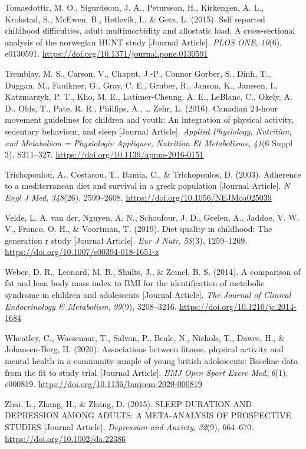 \documentclass[
  letterpaper,
  DIV=11,
  numbers=noendperiod]{scrreport}
\newlength{\cslhangindent}
\newenvironment{CSLReferences}[2] %
 {\begin{list}{}{%
  \setlength{\itemindent}{0pt}
  \setlength{\leftmargin}{0pt}
  \setlength{\parsep}{0pt}
  \ifodd #1
   \setlength{\leftmargin}{\cslhangindent}
   \setlength{\itemindent}{-1\cslhangindent}
  \fi
  \setlength{\itemsep}{#2\baselineskip}}}
 {\end{list}}
\begin{document}
\begin{CSLReferences}{1}{0}
Tomasdottir, M. O., Sigurdsson, J. A., Petursson, H., Kirkengen, A. L.,
Krokstad, S., McEwen, B., Hetlevik, I., \& Getz, L. (2015). Self
reported childhood difficulties, adult multimorbidity and allostatic
load. A cross-sectional analysis of the norwegian HUNT study {[}Journal
Article{]}. \emph{PLOS ONE}, \emph{10}(6), e0130591.
\url{https://doi.org/10.1371/journal.pone.0130591}

Tremblay, M. S., Carson, V., Chaput, J.-P., Connor Gorber, S., Dinh, T.,
Duggan, M., Faulkner, G., Gray, C. E., Gruber, R., Janson, K., Janssen,
I., Katzmarzyk, P. T., Kho, M. E., Latimer-Cheung, A. E., LeBlanc, C.,
Okely, A. D., Olds, T., Pate, R. R., Phillips, A., \ldots{} Zehr, L.
(2016). Canadian 24-hour movement guidelines for children and youth: An
integration of physical activity, sedentary behaviour, and sleep
{[}Journal Article{]}. \emph{Applied Physiology, Nutrition, and
Metabolism = Physiologie Appliquee, Nutrition Et Metabolisme},
\emph{41}(6 Suppl 3), S311--327.
\url{https://doi.org/10.1139/apnm-2016-0151}

Trichopoulou, A., Costacou, T., Bamia, C., \& Trichopoulos, D. (2003).
Adherence to a mediterranean diet and survival in a greek population
{[}Journal Article{]}. \emph{N Engl J Med}, \emph{348}(26), 2599--2608.
\url{https://doi.org/10.1056/NEJMoa025039}

Velde, L. A. van der, Nguyen, A. N., Schoufour, J. D., Geelen, A.,
Jaddoe, V. W. V., Franco, O. H., \& Voortman, T. (2019). Diet quality in
childhood: The generation r study {[}Journal Article{]}. \emph{Eur J
Nutr}, \emph{58}(3), 1259--1269.
\url{https://doi.org/10.1007/s00394-018-1651-z}

Weber, D. R., Leonard, M. B., Shults, J., \& Zemel, B. S. (2014). A
comparison of fat and lean body mass index to BMI for the identification
of metabolic syndrome in children and adolescents {[}Journal Article{]}.
\emph{The Journal of Clinical Endocrinology \& Metabolism},
\emph{99}(9), 3208--3216. \url{https://doi.org/10.1210/jc.2014-1684}

Wheatley, C., Wassenaar, T., Salvan, P., Beale, N., Nichols, T., Dawes,
H., \& Johansen-Berg, H. (2020). Associations between fitness, physical
activity and mental health in a community sample of young british
adolescents: Baseline data from the fit to study trial {[}Journal
Article{]}. \emph{BMJ Open Sport Exerc Med}, \emph{6}(1), e000819.
\url{https://doi.org/10.1136/bmjsem-2020-000819}

Zhai, L., Zhang, H., \& Zhang, D. (2015). SLEEP DURATION AND DEPRESSION
AMONG ADULTS: A META-ANALYSIS OF PROSPECTIVE STUDIES {[}Journal
Article{]}. \emph{Depression and Anxiety}, \emph{32}(9), 664--670.
\url{https://doi.org/10.1002/da.22386}

\end{CSLReferences}
\end{document}
